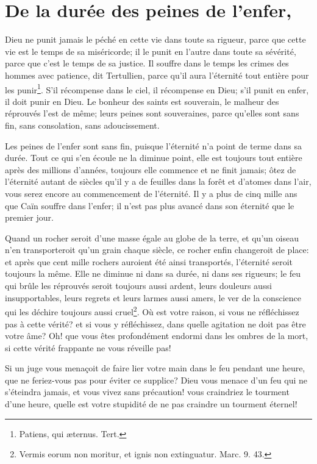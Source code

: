 \documentclass[instructions.tex]{subfiles}
\begin{document}
 
\chapter{De la durée des peines de l’enfer,}
 
Dieu ne punit jamais le péché en cette vie dans toute sa rigueur, parce que cette vie est le temps de sa miséricorde; il le punit en l’autre dans toute sa sévérité, parce que c’est le temps de sa justice. Il souffre dans le temps les crimes des hommes avec patience, dit Tertullien, parce qu’il aura l’éternité tout entière pour les punir\footnote{Patiens, qui æternus. Tert.}. S’il récompense dans le ciel, il récompense en Dieu; s’il punit en enfer, il doit punir en Dieu. Le bonheur des saints est souverain, le malheur des réprouvés l’est de même; leurs peines sont souveraines, parce qu’elles sont sans fin, sans consolation, sans adoucissement.
 
\primo Les peines de l’enfer sont sans fin, puisque l’éternité n’a point de terme dans sa durée. Tout ce qui s’en écoule ne la diminue point, elle est toujours tout entière après des millions d’années, toujours elle commence et ne finit jamais; ôtez de l’éternité autant de siècles qu’il y a de feuilles dans la forêt et d’atomes dans l’air, vous serez encore au commencement de l’éternité. Il y a plus de cinq mille ans que Caïn souffre dans l’enfer; il n’est pas plus avancé dans son éternité que le premier jour.
 
Quand un rocher seroit d’une masse égale au globe de la terre, et qu’un oiseau n’en transporteroit qu’un grain chaque siècle, ce rocher enfin changeroit de place: et après que cent mille rochers auroient été ainsi transportés, l’éternité seroit toujours la même. Elle ne diminue ni dans sa durée, ni dans ses rigueurs; le feu qui brûle les réprouvés seroit toujours aussi ardent, leurs douleurs aussi insupportables, leurs regrets et leurs larmes aussi amers, le ver de la conscience qui les déchire toujours aussi cruel\footnote{Vermis eorum non moritur, et ignis non extinguatur. Marc. 9. 43.}. Où est votre raison, si vous ne réfléchissez pas à cette vérité? et si vous y réfléchissez, dans quelle agitation ne doit pas être votre âme? Oh! que vous êtes profondément endormi dans les ombres de la mort, si cette vérité frappante ne vous réveille pas!
 
Si un juge vous menaçoit de faire lier votre main dans le feu pendant une heure, que ne feriez-vous pas pour éviter ce supplice? Dieu vous menace d’un feu qui ne s’éteindra jamais, et vous vivez sans précaution! vous craindriez le tourment d’une heure, quelle est votre stupidité de ne pas craindre un tourment éternel!
 
\end{document}
